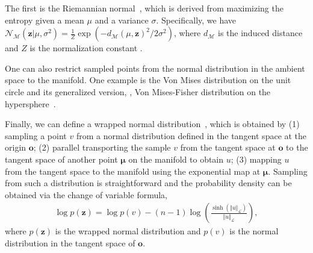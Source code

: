 The first is the Riemannian normal~\cite{pennec2006intrinsic, said2014new}, which is derived from maximizing the entropy given a mean $\mu$ and a variance $\sigma$.
Specifically, we have $\mathcal{N}_{\mathcal{M}}(\textbf{z} \vert \mu, \sigma^{2}) = \frac{1}{Z} \exp \left( - d_{\mathcal{M}}(\mu, \textbf{z})^2 / 2 \sigma^{2} \right)$, where $d_{\mathcal{M}}$ is the induced distance and $Z$ is the normalization constant \cite{said2014new, mathieu2019continuous}.

One can also restrict sampled points from the normal distribution in the ambient space to the manifold.
One example is the Von Mises distribution on the unit circle and its generalized version, \ie, Von Mises-Fisher distribution on the hypersphere~\cite{davidson2018hyperspherical}.

Finally, we can define a wrapped normal distribution~\cite{falorsi2019reparameterizing,nagano2019wrapped}, which is obtained by (1) sampling a point $v$ from a normal distribution defined in the tangent space at the origin $\textbf{o}$; (2) parallel transporting the sample $v$ from the tangent space at $\textbf{o}$ to the tangent space of another point $\boldsymbol{\mu}$ on the manifold to obtain $u$; (3) mapping $u$ from the tangent space to the manifold using the exponential map at $\boldsymbol{\mu}$.
Sampling from such a distribution is straightforward and the probability density can be obtained via the change of variable formula,
\begin{align}
    \log p(\textbf{z}) = \log p(v) - (n-1) \log \left(\frac{\sinh{ ( \Vert u \Vert_{\mathcal{L}} ) }}{ \Vert u \Vert_{\mathcal{L}} } \right),
\end{align}
where $p(\textbf{z})$ is the wrapped normal distribution and $p(v)$ is the normal distribution in the tangent space of $\textbf{o}$.




